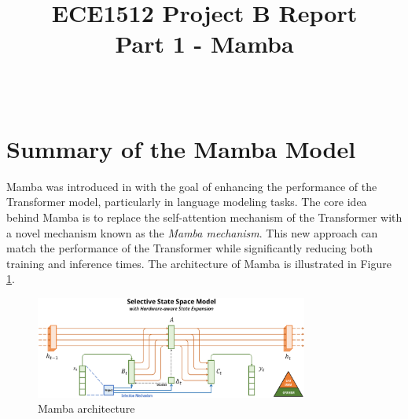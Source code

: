 \documentclass[onecolumn]{IEEEtran}
\begin{document}
\title{ECE1512 Project B Report\\Part 1 - Mamba}

\author{ \\
}

\maketitle
\thispagestyle{fancy} %




\section{Summary of the Mamba Model}
Mamba was introduced in \cite{gu2024mambalineartimesequencemodeling} with the goal of enhancing the performance of the Transformer model, particularly in language modeling tasks. The core idea behind Mamba is to replace the self-attention mechanism of the Transformer with a novel mechanism known as the \textit{Mamba mechanism}. This new approach can match the performance of the Transformer while significantly reducing both training and inference times. The architecture of Mamba is illustrated in Figure \ref{fig:mamba_architecture}.

\begin{figure}[H]
    \centering
    \includegraphics[width=0.8\textwidth]{images/mamba_architecture.png}
    \caption{Mamba architecture}
    \label{fig:mamba_architecture}
\end{figure}
\end{document}
